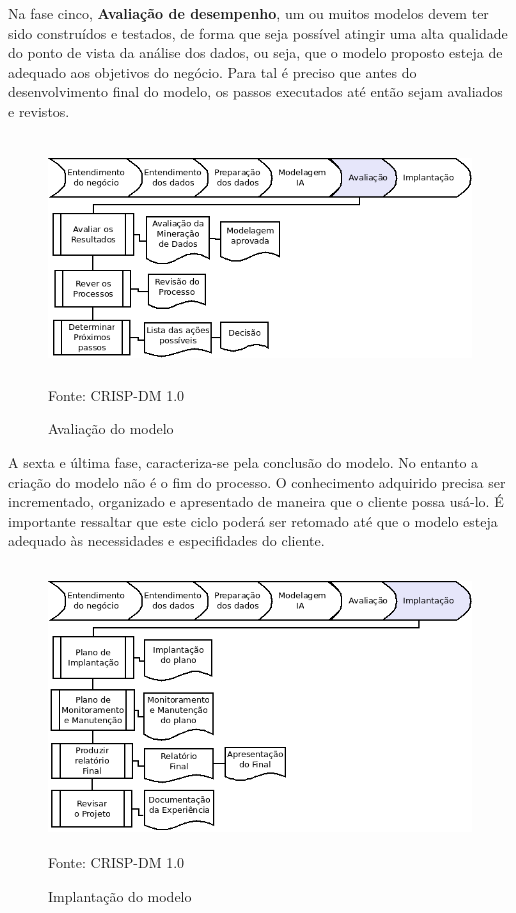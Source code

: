 \pagebreak

Na fase cinco, \textbf{Avaliação de desempenho}, um ou muitos modelos devem ter sido construídos e testados, 
de forma que seja possível atingir uma alta qualidade do ponto de vista da análise dos dados, ou seja, que o 
modelo proposto esteja de adequado aos objetivos do negócio. Para tal é preciso que antes do desenvolvimento final 
do modelo, os passos executados até então sejam avaliados e revistos.

\begin{figure}[!ht]
\centering
\caption{Avaliação do modelo}
\vspace{1mm}
\includegraphics[width=120mm, height=65mm]{Figuras/Cronograma/Avaliacao.png}\\
\tiny Fonte: CRISP-DM 1.0
\end{figure}

\pagebreak

A sexta e última fase, caracteriza-se pela conclusão do modelo. No entanto a criação do modelo não é o fim do processo.
O conhecimento adquirido precisa ser incrementado, organizado e apresentado de maneira que o cliente possa usá-lo.
É importante ressaltar que este ciclo poderá ser retomado até que o modelo esteja adequado às necessidades e especifidades do cliente.

\begin{figure}[!ht]
\centering
\caption{Implantação do modelo}
\vspace{1mm}
\includegraphics[width=120mm, height=75mm]{Figuras/Cronograma/Implantacao.png}\\
\tiny Fonte: CRISP-DM 1.0
\end{figure}

